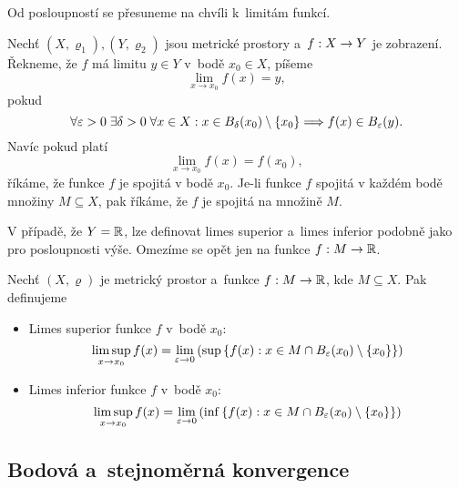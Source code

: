 Od posloupností se přesuneme na chvíli k~limitám funkcí.
\begin{definition}\label{def:limita-fce-v-bode}
    Nechť $(X,\varrho_1),(Y,\varrho_2)$ jsou metrické prostory a~$f:X \rightarrow Y$ je zobrazení. Řekneme, že $f$ má limitu $y\in Y$ v~bodě $x_0\in X$, píšeme
    \[\lim_{x\to x_0}f(x)=y,\]
    pokud
    \[\forall \varepsilon >0\;\exists \delta >0\;\forall x\in X: x\in B_\delta(x_0)\setminus\left\{x_0\right\}\Longrightarrow f(x)\in B_\varepsilon(y).\]
    Navíc pokud platí
    \[\lim_{x\to x_0}f(x)=f(x_0),\]
    říkáme, že funkce $f$ je spojitá v bodě $x_0$. Je-li funkce $f$ spojitá v každém bodě množiny $M\subseteq X$, pak říkáme, že $f$ je spojitá na množině $M$.
\end{definition}
V případě, že $Y=\mathbb{R}$, lze definovat limes superior a~limes inferior podobně jako pro posloupnosti výše. Omezíme se opět jen na funkce $f:M \rightarrow \mathbb{R}$.
\begin{definition}\label{def:limsup-liminf-funkce}
    Nechť $(X,\varrho)$ je metrický prostor a~funkce $f:M \rightarrow \mathbb{R}$, kde $M\subseteq X$. Pak definujeme
    \begin{itemize}
        \item Limes superior funkce $f$ v~bodě $x_0$:
        \[\limsup _{x\to x_0}f(x)=\lim _{\varepsilon \to 0}\left(\sup\left\{f(x):x\in M\cap B_\varepsilon(x_0)\setminus \{x_0\}\right\}\right)\]
        \item Limes inferior funkce $f$ v~bodě $x_0$:
        \[\limsup _{x\to x_0}f(x)=\lim _{\varepsilon \to 0}\left(\inf\left\{f(x):x\in M\cap B_\varepsilon(x_0)\setminus \{x_0\}\right\}\right)\]
    \end{itemize}
\end{definition}

\subsection{Bodová a~stejnoměrná konvergence}\label{subsec:bodova-stejnomerna-konvergence}


